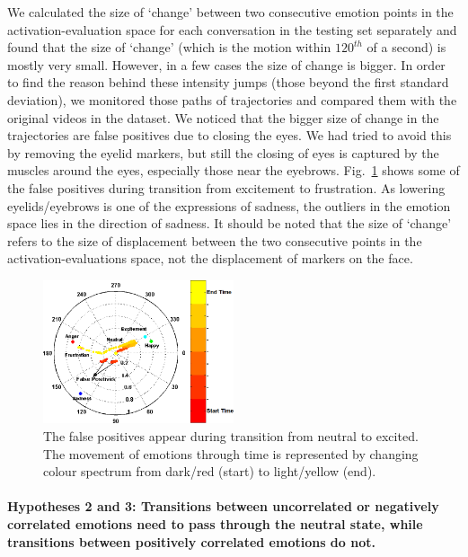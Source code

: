 \documentclass[10pt,journal,cspaper,compsoc]{IEEEtran}
\begin{document}
We calculated the size of `change' between two consecutive emotion points in the activation-evaluation space for each conversation in the testing set separately and found that the size of `change' (which is the motion within $120^{th}$ of a second) is mostly very small. However, in a few cases the size of change is bigger. In order to find the reason behind these intensity jumps (those beyond the first standard deviation), we monitored those paths of trajectories and compared them with the original videos in the dataset. We noticed that the bigger size of change in the trajectories are  false positives due to closing the eyes. We had tried to avoid this by removing the eyelid markers, but still the closing of eyes is captured by the muscles around the eyes, especially those near the eyebrows. Fig.~\ref{fig_false_pos} shows some of the false positives during transition from excitement to frustration. As lowering eyelids/eyebrows is one of the expressions of sadness, the outliers in the emotion space lies in the direction of sadness. It should be noted that the size of `change' refers to the size of displacement between the two consecutive points in the activation-evaluations space, not the displacement of markers on the face.

\begin{figure}[!ht]
\centering
\includegraphics[width=0.5\textwidth]{figures/Ch7/false_pos_color.png}
\caption{The false positives appear during transition from neutral to excited. The movement of emotions through time is represented by changing colour spectrum from dark/red (start) to light/yellow (end).}
\label{fig_false_pos}
\end{figure}

\paragraph*{Hypotheses 2 and 3: Transitions between uncorrelated or negatively correlated emotions need to pass through the neutral state, while transitions between positively correlated emotions do not.}
\label{para_hypothesis_2_3}
\end{document}
